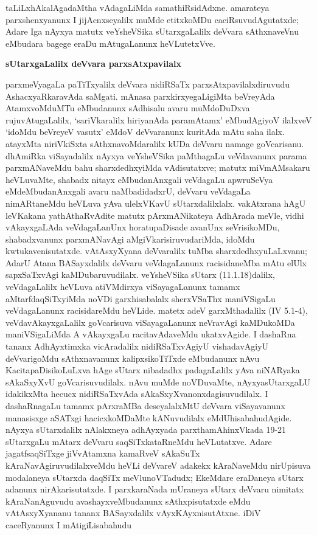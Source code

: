 taLiLxhAkalAgadaMtha vAdagaLiMda samathiRsidAdxne. amarateya parxshenxyanunx I jijAcnxseyalilx muMde etitxkoMDu caciRsuvudAgutatxde; Adare Iga nAyxya matutx veYsheVSika sUtarxgaLalilx deVvara sAthxnaveVnu eMbudara bagege eraDu mAtugaLanunx heVLutetxVve.

\smallskip
\begin{center}
{\Large\bf sUtarxgaLalilx deVvara parxsAtxpavilalx}
\end{center}

parxmeVyagaLa paTiTxyalilx deVvara nidiRSaTx parxsAtxpavilalxdiruvudu AshacxyaRkaravAda saMgati. mAnasa parxkirxyegaLigiMta beVreyAda AtamxvoMduMTu eMbudanunx sAdhisalu avaru muMdoDuDxva rujuvAtugaLalilx, `sariVkaralilx hiriyanAda paramAtamx' eMbudAgiyoV ilalxveV `idoMdu beVreyeV vasutx' eMdoV deVvaranunx kuritAda mAtu saha ilalx. atayxMta niriVkiSxta sAthxnavoMdaralilx kUDa deVvaru namage goVcarisanu. dhAmiRka viSayadalilx nAyxya veYsheVSika paMthagaLu veVdavanunx parama parxmANaveMdu bahu sharxdedhxyiMda vAdisutatxve; matutx miVmAMsakaru heVLuvaMte, shabadx nitayx eMbudanAnxgali veVdagaLu apwruSeVya eMdeMbudanAnxgali avaru naMbadidadxrU, deVvaru veVdagaLa nimARtaneMdu heVLuva yAva ulelxVKavU sUtarxdalilxlalx. vakAtxrana hAgU leVKakana yathAthaRvAdite matutx pArxmANikateya AdhArada meVle, vidhi vAkayxgaLAda veVdagaLanUnx horatupaDisade avanUnx seVrisikoMDu, shabadxvanunx parxmANavAgi aMgiVkarisiruvudariMda, idoMdu kwtukavenisutatxde. vAtAsxyXyana deVvaralilx tuMba sharxdedhxyuLaLxvanu; AdarU Atana BASayxdalilx deVvaru veVdagaLanunx racisidaneMba mAtu elUlx sapxSaTxvAgi kaMDubaruvudilalx. veYsheVSika sUtarx {\rm(11.1.18)}dalilx, veVdagaLalilx heVLuva atiVMdirxya viSayagaLanunx tamamx aMtarfdaqSiTxyiMda noVDi garxhisabalalx sherxVSaThx maniVSigaLu veVdagaLanunx racisidareMdu heVLide. matetx adeV garxMthadalilx {\rm(IV 5.1-4)}, veVdavAkayxgaLalilx goVcarisuva viSayagaLanunx neVravAgi kaMDukoMDa maniVSigaLiMda A vAkayxgaLu racitavAdaveMdu ukatxvAgide. I dashaRna tananx AdhAyxtimxka vicAradalilx nidiRSaTxvAgiyU vishadavAgiyU deVvarigoMdu sAthxnavanunx kalipxsikoTiTxde eMbudanunx nAvu KacitapaDisikoLuLxva hAge sUtarx nibadadhx padagaLalilx yAva niNARyaka sAkaSxyXvU goVcarisuvudilalx. nAvu muMde noVDuvaMte, nAyxyasUtarxgaLU idakikxMta hecucx nidiRSaTxvAda sAkaSxyXvanonxdagisuvudilalx. I dashaRnagaLu tamamx pArxraMBa deseyalalxMtU deVvara viSayavanunx manasisxge aSATxgi hacicxkoMDaMte kANuvudilalx eMdUhisabahudAgide. nAyxya sUtarxdalilx nAlakxneya adhAyxyada parxthamAhinxVkada {\rm 19-21} sUtarxgaLu mAtarx deVvaru saqSiTxkataRneMdu heVLutatxve. Adare jagatfsaqSiTxge jiVvAtamxna kamaRveV sAkaSuTx kAraNavAgiruvudilalxveMdu heVLi deVvareV adakekx kAraNaveMdu nirUpisuva modalaneya sUtarxda daqSiTx meVlunoVTadudx; EkeMdare eraDaneya sUtarx adanunx nirAkarisutatxde. I parxkaraNada mUraneya sUtarx deVvaru nimitatx kAraNanAguvudu avashayxveMbudanunx sAthxpisutatxde eMdu vAtAsxyXyananu tananx BASayxdalilx vAyxKAyxnisutAtxne. iDiV caceRyanunx I mAtigiLisabahudu 